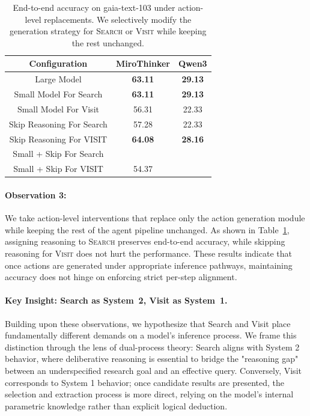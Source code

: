 \begin{table}[h]
    \centering
    \caption{End-to-end accuracy on gaia-text-103 under action-level replacements.
We selectively modify the generation strategy for \textsc{Search} or \textsc{Visit} while keeping the rest unchanged.}
    \label{tab:placeholder_label}
    \begin{tabular}{ccc}
        \toprule
        Configuration & MiroThinker& Qwen3 \\
        \midrule
        Large Model                 & \textbf{63.11} & \textbf{29.13} \\
        Small Model For Search      & \textbf{63.11} & \textbf{29.13} \\
        Small Model For Visit       & 56.31 & 22.33 \\
        Skip Reasoning For Search   & 57.28 & 22.33 \\
        Skip Reasoning For VISIT    & \textbf{64.08} & \textbf{28.16} \\
        Small + Skip  For Search    &  &  \\
        Small + Skip  For VISIT    & 54.37 &  \\
        \bottomrule
    \end{tabular}
\end{table}

\paragraph{Observation 3:}
We take action-level interventions that replace only the action generation module while keeping the rest of the agent pipeline unchanged.
As shown in Table~\ref{tab:placeholder_label}, assigning reasoning to \textsc{Search} preserves end-to-end accuracy, while skipping reasoning for \textsc{Visit} does not hurt the performance. These results indicate that once actions are generated under appropriate inference pathways, maintaining accuracy does not hinge on enforcing strict per-step alignment.

\paragraph{Key Insight: Search as System~2, Visit as System~1.}
Building upon these observations, we hypothesize that Search and Visit place fundamentally different demands on a model's inference process. We frame this distinction through the lens of dual-process theory: Search aligns with System 2 behavior, where deliberative reasoning is essential to bridge the "reasoning gap" between an underspecified research goal and an effective query. Conversely, Visit corresponds to System 1 behavior; once candidate results are presented, the selection and extraction process is more direct, relying on the model’s internal parametric knowledge rather than explicit logical deduction.

